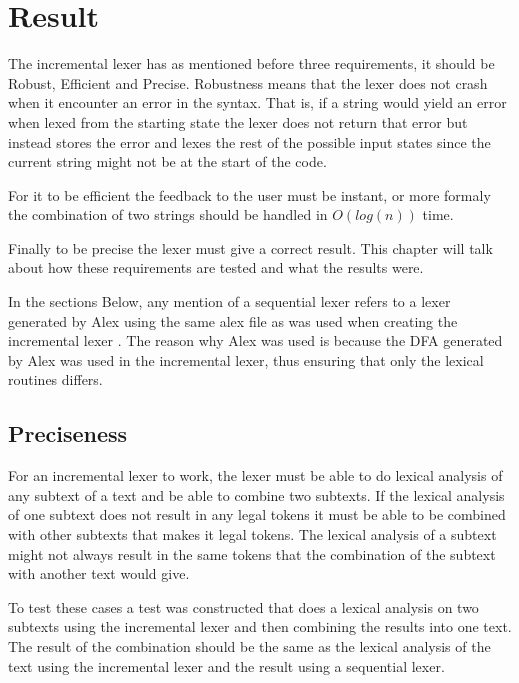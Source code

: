 \chapter{Result}
The incremental lexer has as mentioned before three requirements, it should be
Robust, Efficient and Precise. Robustness means that the lexer does not crash
when it encounter an error in the syntax. That is, if a string would yield an
error when lexed from the starting state the lexer does not return that error but
instead stores the error and lexes the rest of the possible input states since
the current string might not be at the start of the code.

For it to be efficient
the feedback to the user must be instant, or more formaly the combination of two
strings should be handled in $O(log(n))$ time.

Finally to be precise the lexer
must give a correct result. This chapter will talk about how these requirements
are tested and what the results were.

In the sections Below, any mention of a sequential lexer refers to a lexer
generated by Alex using the same alex file as was used when creating the
incremental lexer \cite{alex}. The reason why Alex was used is because the DFA
generated by Alex was used in the incremental lexer, thus ensuring that only the
lexical routines differs.

\section{Preciseness}
For an incremental lexer to work, the lexer must be able to do lexical analysis
of any subtext of a text and be able to combine two subtexts. If the lexical
analysis of one subtext does not result in any legal tokens it must be able to be
combined with other subtexts that makes it legal tokens. The lexical analysis of
a subtext might not always result in the same tokens that the combination of the
subtext with another text would give.

To test these cases a test was constructed that does a lexical analysis on two
subtexts using the incremental lexer and then combining the results into one
text. The result of the combination should be the same as the lexical analysis
of the text using the incremental lexer and the result using a sequential lexer.


